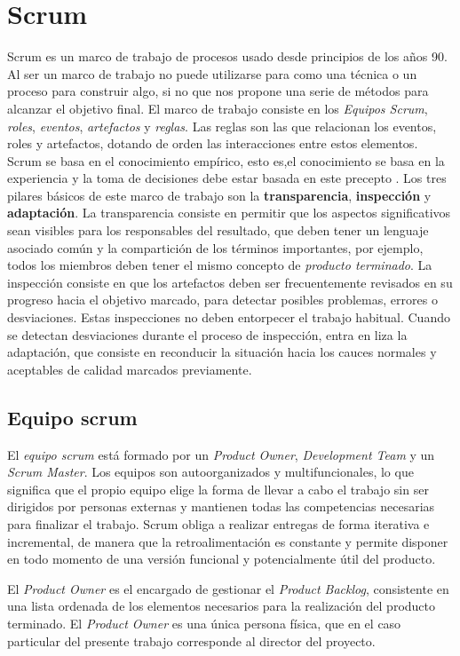 \section{Scrum}
Scrum es un marco de trabajo de procesos usado desde principios de los años 90. Al ser un marco de trabajo no puede utilizarse para como una técnica o un proceso para construir algo, si no que nos propone una serie de métodos para alcanzar el objetivo final.
El marco de trabajo consiste en los \textit{Equipos Scrum}, \textit{roles}, \textit{eventos}, \textit{artefactos} y \textit{reglas}.
Las reglas son las que relacionan los eventos, roles y artefactos, dotando de orden las interacciones entre estos elementos.
Scrum se basa en el conocimiento empírico, esto es,el conocimiento se basa en la experiencia y la toma de decisiones debe estar basada en este precepto \cite{Sch13}.
Los tres pilares básicos de este marco de trabajo son la \textbf{transparencia}, \textbf{inspección} y \textbf{adaptación}.
La transparencia consiste en permitir que los aspectos significativos sean visibles para los responsables del resultado, que deben tener un lenguaje asociado común y la compartición de los términos importantes, por ejemplo, todos los miembros deben tener el mismo concepto de \textit{producto terminado}.
La inspección consiste en que los artefactos deben ser frecuentemente revisados en su progreso hacia el objetivo marcado, para detectar posibles problemas, errores o desviaciones. Estas inspecciones no deben entorpecer el trabajo habitual.
Cuando se detectan desviaciones durante el proceso de inspección, entra en liza la adaptación, que consiste en reconducir la situación hacia los cauces normales y aceptables de calidad marcados previamente.

\subsection{Equipo scrum}
El \textit{equipo scrum} está formado por un \textit{Product Owner}, \textit{Development Team} y un \textit{Scrum Master}. Los equipos son autoorganizados y multifuncionales, lo que significa que el propio equipo elige la forma de llevar a cabo el trabajo sin ser dirigidos por personas externas y mantienen todas las competencias necesarias para finalizar el trabajo.
Scrum obliga a realizar entregas de forma iterativa e incremental, de manera que la retroalimentación es constante y permite disponer en todo momento de una versión funcional y potencialmente útil del producto.

El \textit{Product Owner} es el encargado de gestionar el \textit{Product Backlog}, consistente en una lista ordenada de los elementos necesarios para la realización del producto terminado. El \textit{Product Owner} es una única persona física, que en el caso particular del presente trabajo corresponde al director del proyecto.

